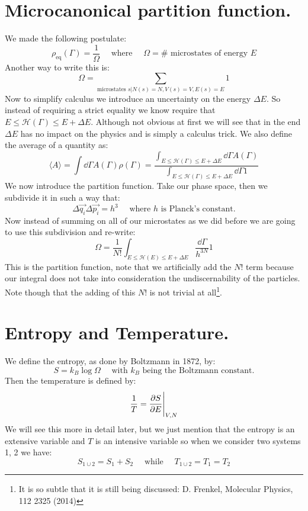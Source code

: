 \documentclass[10pt,a4paper]{book}
\begin{document}
\section{Microcanonical partition function.}
We made the following postulate:
\[
\rho_{\text{eq}} (\Gamma) = \frac{1}{\Omega} \quad \text{ where } \quad \Omega = \# \text{ microstates of energy } E
\]
Another way to write this is:
\[
\Omega = \sum_{\text{microstates } s| N(s) = N, V(s) = V, E(s) = E} 1
\]
Now to simplify calculus we introduce an uncertainty on the energy $\Delta E$. So instead of requiring a strict equality we know require that $E \leq \mathcal{H}(\Gamma) \leq E + \Delta E$. Although not obvious at first we will see that in the end $\Delta E$ has no impact on the physics and is simply a calculus trick. We also define the average of a quantity as:
\[
\langle A \rangle = \int \dd\Gamma A(\Gamma)\rho(\Gamma) = \frac{\int_{E \leq \mathcal{H}(\Gamma) \leq E + \Delta E} \dd \Gamma A(\Gamma)}{\int_{E \leq \mathcal{H}(\Gamma) \leq E + \Delta E} \dd \Gamma 1}
\]
We now introduce the partition function. Take our phase space, then we subdivide it in such a way that:
\[
\Delta \overrightarrow{q_{i}} \Delta \overrightarrow{p_{i}} = h^3 \quad \text{ where } h \text{ is Planck's constant.}
\]
Now instead of summing on all of our microstates as we did before we are going to use this subdivision and re-write:
\begin{equation}
\Omega = \frac{1}{N!} \int_{E \leq \mathcal{H}(E) \leq E + \Delta E} \frac{\dd \Gamma}{h^{3N}}1
\end{equation}
This is the partition function, note that we artificially add the $N!$ term because our integral does not take into consideration the undiscernability of the particles. Note though that the adding of this $N!$ is not trivial at all\footnote{It is so subtle that it is still being discussed: D. Frenkel, Molecular Physics, 112 2325 (2014)}.

\section{Entropy and Temperature.}
We define the entropy, as done by Boltzmann in 1872, by:
\begin{equation}
S = k_B \log\Omega \quad \text{ with } k_B \text{ being the Boltzmann constant.}
\end{equation}
Then the temperature is defined by:
\[
\frac{1}{T} = \pdv{S}{E}\Bigg|_{V,N}
\]
We will see this more in detail later, but we just mention that the entropy is an extensive variable and $T$ is an intensive variable so when we consider two systems 1, 2 we have:
\[
S_{1 \cup 2} = S_1 + S_2 \quad \text{ while } \quad T_{1 \cup 2} = T_1 = T_2
\]
\end{document}
